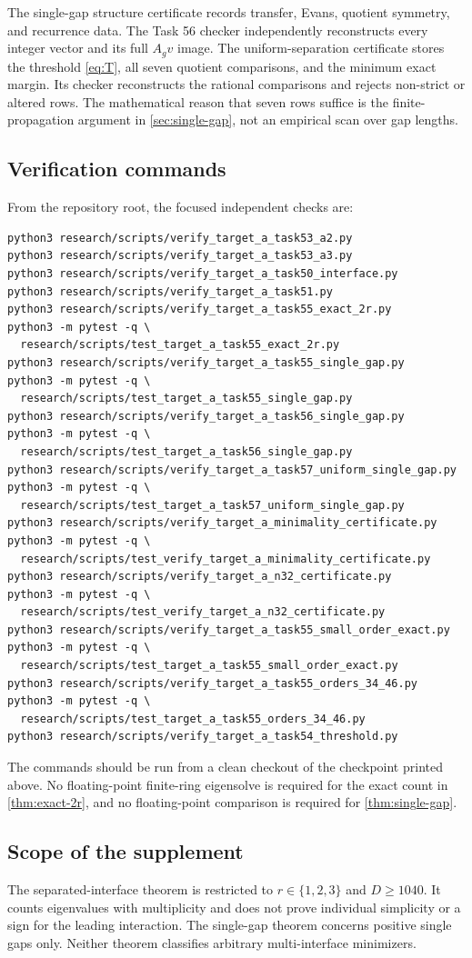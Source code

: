The single-gap structure certificate records transfer, Evans, quotient
symmetry, and recurrence data.  The Task 56 checker independently
reconstructs every integer vector and its full \(A_gv\) image.  The
uniform-separation certificate stores the threshold \eqref{eq:T}, all seven
quotient comparisons, and the minimum exact margin.  Its checker reconstructs
the rational comparisons and rejects non-strict or altered rows.  The
mathematical reason that seven
rows suffice is the finite-propagation argument in
\cref{sec:single-gap}, not an empirical scan over gap lengths.

\subsection{Verification commands}

From the repository root, the focused independent checks are:
\begin{verbatim}
python3 research/scripts/verify_target_a_task53_a2.py
python3 research/scripts/verify_target_a_task53_a3.py
python3 research/scripts/verify_target_a_task50_interface.py
python3 research/scripts/verify_target_a_task51.py
python3 research/scripts/verify_target_a_task55_exact_2r.py
python3 -m pytest -q \
  research/scripts/test_target_a_task55_exact_2r.py
python3 research/scripts/verify_target_a_task55_single_gap.py
python3 -m pytest -q \
  research/scripts/test_target_a_task55_single_gap.py
python3 research/scripts/verify_target_a_task56_single_gap.py
python3 -m pytest -q \
  research/scripts/test_target_a_task56_single_gap.py
python3 research/scripts/verify_target_a_task57_uniform_single_gap.py
python3 -m pytest -q \
  research/scripts/test_target_a_task57_uniform_single_gap.py
python3 research/scripts/verify_target_a_minimality_certificate.py
python3 -m pytest -q \
  research/scripts/test_verify_target_a_minimality_certificate.py
python3 research/scripts/verify_target_a_n32_certificate.py
python3 -m pytest -q \
  research/scripts/test_verify_target_a_n32_certificate.py
python3 research/scripts/verify_target_a_task55_small_order_exact.py
python3 -m pytest -q \
  research/scripts/test_target_a_task55_small_order_exact.py
python3 research/scripts/verify_target_a_task55_orders_34_46.py
python3 -m pytest -q \
  research/scripts/test_target_a_task55_orders_34_46.py
python3 research/scripts/verify_target_a_task54_threshold.py
\end{verbatim}
The commands should be run from a clean checkout of the checkpoint printed
above.  No floating-point finite-ring eigensolve is required for the exact
count in \cref{thm:exact-2r}, and no floating-point comparison is required
for \cref{thm:single-gap}.

\subsection{Scope of the supplement}

The separated-interface theorem is restricted to
\(r\in\{1,2,3\}\) and \(D\geq1040\).  It counts eigenvalues with
multiplicity and does not prove individual simplicity or a sign for the
leading interaction.  The single-gap theorem concerns positive single gaps
only.  Neither theorem classifies arbitrary multi-interface minimizers.
